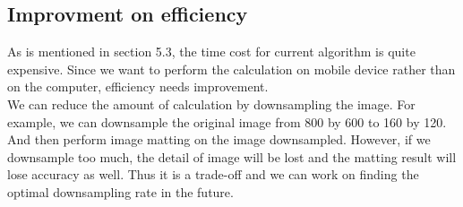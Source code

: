 \documentclass[11pt,letterpaper]{article}
\begin{document}
\subsection{Improvment on efficiency}
As is mentioned in section 5.3, the time cost for current algorithm is quite expensive. Since we want to perform the calculation on mobile device rather than on the computer, efficiency needs improvement. \\

We can reduce the amount of calculation by downsampling the image. For example, we can downsample the original image from 800 by 600 to 160 by 120. And then perform image matting on the image downsampled. However, if we downsample too much, the detail of image will be lost and the matting result will lose accuracy as well. Thus it is a trade-off and we can work on finding the optimal downsampling rate in the future. \\



\end{document}
